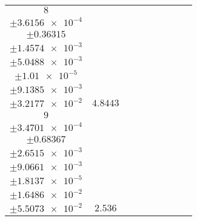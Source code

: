 \documentclass[8pt]{article}
\begin{document}
\begin{longtable}[l]{c c c c c c c c c}
$\num{8}$ & \begin{tabular}[c]{@{}c@{}}$\num{5.6547e-2}$ \\ $\pm\num{3.6156e-4}$\end{tabular} & \begin{tabular}[c]{@{}c@{}}$\num{0.19811}$ \\ $\pm\num{0.36315}$\end{tabular} & \begin{tabular}[c]{@{}c@{}}$\num{10.385}$ \\ $\pm\num{1.4574e-3}$\end{tabular} & \begin{tabular}[c]{@{}c@{}}$\num{2.085e+3}$ \\ $\pm\num{5.0488e-3}$\end{tabular} & \begin{tabular}[c]{@{}c@{}}$\num{4.1712}$ \\ $\pm\num{1.01e-5}$\end{tabular} & \begin{tabular}[c]{@{}c@{}}$\num{1.1857}$ \\ $\pm\num{9.1385e-3}$\end{tabular} & \begin{tabular}[c]{@{}c@{}}$\num{4.3284}$ \\ $\pm\num{3.2177e-2}$\end{tabular} & $\num{4.8443}$\\
$\num{9}$ & \begin{tabular}[c]{@{}c@{}}$\num{2.9773e-2}$ \\ $\pm\num{3.4701e-4}$\end{tabular} & \begin{tabular}[c]{@{}c@{}}$\num{-0.41322}$ \\ $\pm\num{0.68367}$\end{tabular} & \begin{tabular}[c]{@{}c@{}}$\num{-7.5551}$ \\ $\pm\num{2.6515e-3}$\end{tabular} & \begin{tabular}[c]{@{}c@{}}$\num{2.1359e+3}$ \\ $\pm\num{9.0661e-3}$\end{tabular} & \begin{tabular}[c]{@{}c@{}}$\num{4.273}$ \\ $\pm\num{1.8137e-5}$\end{tabular} & \begin{tabular}[c]{@{}c@{}}$\num{1.1615}$ \\ $\pm\num{1.6486e-2}$\end{tabular} & \begin{tabular}[c]{@{}c@{}}$\num{4.1234}$ \\ $\pm\num{5.5073e-2}$\end{tabular} & $\num{2.536}$\\

\end{longtable}
\end{document}
